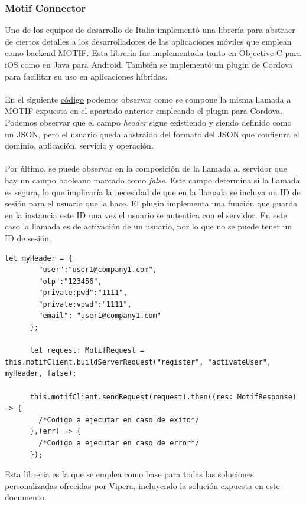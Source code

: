 \documentclass[a4paper, 12pt]{article}
\newenvironment{code}{\captionsetup{type=listing}}{}
\begin{document}
\subsubsection{Motif Connector}
\label{sec-2-3-2}
Uno de los equipos de desarrollo de Italia implementó una librería para abstraer de ciertos detalles a los desarrolladores
de las aplicaciones móviles que emplean como backend MOTIF. Esta librería fue implementada tanto en Objective-C para iOS
como en Java para Android. También se implementó un plugin de Cordova para facilitar su uso en aplicaciones híbridas.
\\
\\
En el siguiente \hyperref[code:motifconnector]{código} podemos observar como se compone la misma llamada a MOTIF expuesta en
el apartado anterior empleando el plugin para Cordova. Podemos observar que el campo \emph{header} sigue existiendo y siendo definido
como un JSON, pero el usuario queda abstraido del formato del JSON que configura el dominio, aplicación, servicio y operación.
\\
\\
Por último, se puede observar en la composición de la llamada al servidor que hay un campo booleano marcado como \emph{false}. Este
campo determina si la llamada es segura, lo que implicaría la necesidad de que en la llamada se incluya un ID de sesión para el
usuario que la hace. El plugin implementa una función que guarda en la instancia este ID una vez el usuario se autentica con el
servidor. En este caso la llamada es de activación de un usuario, por lo que no se puede tener un ID de sesión.
\begin{code}
\label{code:motifconnector}
\begin{verbatim}
let myHeader = {
        "user":"user1@company1.com",
        "otp":"123456",
        "private:pwd":"1111",
        "private:vpwd":"1111",
        "email": "user1@company1.com"
      };

      let request: MotifRequest = this.motifClient.buildServerRequest("register", "activateUser", myHeader, false);

      this.motifClient.sendRequest(request).then((res: MotifResponse) => {
        /*Codigo a ejecutar en caso de exito*/
      },(err) => {
        /*Codigo a ejecutar en caso de error*/
      });
\end{verbatim}
\end{code}
\bigbreak
Esta libreria es la que se emplea como base para todas las soluciones personalizadas ofrecidas por Vipera, incluyendo la solución
expuesta en este documento.
\end{document}
